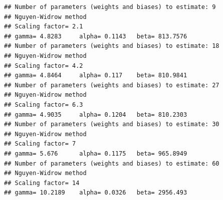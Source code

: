 \begin{Shaded}
\begin{Highlighting}[]
\OtherTok{\textless{}{-}}\SpecialCharTok{$}
\OtherTok{\textless{}{-}}\SpecialCharTok{$}
\OtherTok{\textless{}{-}} 
\OtherTok{\textless{}{-}} 
\OtherTok{\textless{}{-}} 

 \NormalTok{(}\NormalTok{,}\NormalTok{,}\NormalTok{,}\NormalTok{,}\NormalTok{))\{}

\OtherTok{\textless{}{-}} \SpecialCharTok{\textasciitilde{}}

\OtherTok{\textless{}{-}}  \NormalTok{(}\SpecialCharTok{$}

\OtherTok{\textless{}{-}} \SpecialCharTok{$}\SpecialCharTok{{-}}\SpecialCharTok{\^{}}\NormalTok{) }

\OtherTok{\textless{}{-}}\NormalTok{  brnn[[}\NormalTok{]]}
\OtherTok{\textless{}{-}}
\NormalTok{\}}
\end{Highlighting}
\end{Shaded}

\begin{verbatim}
## Number of parameters (weights and biases) to estimate: 9 
## Nguyen-Widrow method
## Scaling factor= 2.1 
## gamma= 4.8283     alpha= 0.1143   beta= 813.7576 
## Number of parameters (weights and biases) to estimate: 18 
## Nguyen-Widrow method
## Scaling factor= 4.2 
## gamma= 4.8464     alpha= 0.117    beta= 810.9841 
## Number of parameters (weights and biases) to estimate: 27 
## Nguyen-Widrow method
## Scaling factor= 6.3 
## gamma= 4.9035     alpha= 0.1204   beta= 810.2303 
## Number of parameters (weights and biases) to estimate: 30 
## Nguyen-Widrow method
## Scaling factor= 7 
## gamma= 5.676      alpha= 0.1175   beta= 965.8949 
## Number of parameters (weights and biases) to estimate: 60 
## Nguyen-Widrow method
## Scaling factor= 14 
## gamma= 10.2189    alpha= 0.0326   beta= 2956.493
\end{verbatim}

